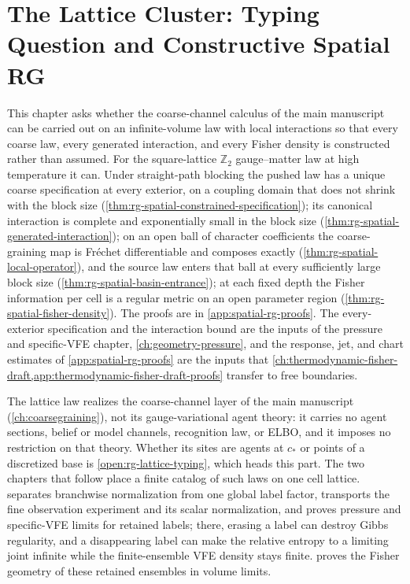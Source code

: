 \chapter{The Lattice Cluster: Typing Question and Constructive Spatial RG}
\label{ch:constructive-spatial-rg}

This chapter asks whether the coarse-channel calculus of the main manuscript
can be carried out on an infinite-volume law with local interactions so that
every coarse law, every generated interaction, and every Fisher density is
constructed rather than assumed. For the square-lattice \(\mathbb Z_2\)
gauge--matter law at high temperature it can. Under straight-path blocking
the pushed law has a unique coarse specification at every exterior, on a
coupling domain that does not shrink with the block size
(\cref{thm:rg-spatial-constrained-specification}); its canonical interaction
is complete and exponentially small in the block size
(\cref{thm:rg-spatial-generated-interaction}); on an open ball of character
coefficients the coarse-graining map is Fr\'echet differentiable and
composes exactly (\cref{thm:rg-spatial-local-operator}), and the source law
enters that ball at every sufficiently large block size
(\cref{thm:rg-spatial-basin-entrance}); at each fixed depth the Fisher
information per cell is a regular metric on an open parameter region
(\cref{thm:rg-spatial-fisher-density}). The proofs are in
\cref{app:spatial-rg-proofs}. The every-exterior specification and the
interaction bound are the inputs of the pressure and specific-VFE chapter,
\cref{ch:geometry-pressure}, and the response, jet, and chart estimates of
\cref{app:spatial-rg-proofs} are the inputs that
\cref{ch:thermodynamic-fisher-draft,app:thermodynamic-fisher-draft-proofs}
transfer to free boundaries.

The lattice law realizes the coarse-channel layer of the main manuscript
(\cref{ch:coarsegraining}), not its gauge-variational agent theory: it
carries no agent sections, belief or model channels, recognition law, or
ELBO, and it imposes no restriction on that theory. Whether its sites are
agents at \(c_*\) or points of a discretized base is
\cref{open:rg-lattice-typing}, which heads this part. The two chapters that
follow place a finite catalog of such laws on one cell lattice.
 separates branchwise normalization from one
global label factor, transports the fine observation experiment and its
scalar normalization, and proves pressure and specific-VFE limits for
retained labels; there, erasing a label can destroy Gibbs regularity, and a
disappearing label can make the relative entropy to a limiting joint
infinite while the finite-ensemble VFE density stays finite.
 proves the Fisher geometry of these
retained ensembles in volume limits.

